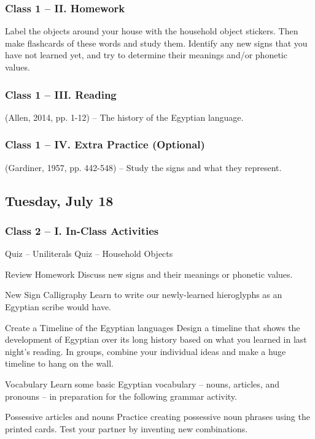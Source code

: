 \documentclass[11pt]{article}
\begin{document}
		\subsubsection*{Class 1 -- II. Homework}
			Label the objects around your house with the household object stickers.
			Then make flashcards of these words and study them.
			Identify any new signs that you have not learned yet, and try to determine their meanings and/or phonetic values.
			
		\subsubsection*{Class 1 -- III. Reading}
			(Allen, 2014, pp. 1-12) -- The history of the Egyptian language.
			
		\subsubsection*{Class 1 -- IV. Extra Practice (Optional)}
			(Gardiner, 1957, pp. 442-548) -- Study the signs and what they represent.
			
	\subsection*{Tuesday, July 18}
		\subsubsection*{Class 2 -- I. In-Class Activities}
			\begin{outline}[itemize]
				\1 Quiz -- Uniliterals
				\1 Quiz -- Household Objects
				
				\1 Review Homework
					\2 Discuss new signs and their meanings or phonetic values.
				
				\1 New Sign Calligraphy
					\2 Learn to write our newly-learned hieroglyphs as an Egyptian scribe would have.
				
				\1 Create a Timeline of the Egyptian languages
					\2 Design a timeline that shows the development of Egyptian over its long history
						based on what you learned in last night's reading.
					\2 In groups, combine your individual ideas and make a huge timeline to hang on the wall.
				
				\1 Vocabulary
					\2 Learn some basic Egyptian vocabulary -- nouns, articles, and pronouns -- in preparation for the following grammar activity.
					
				\1 Possessive articles and nouns
					\2 Practice creating possessive noun phrases using the printed cards.
					\2 Test your partner by inventing new combinations.
					
			\end{outline}
			
\end{document}
